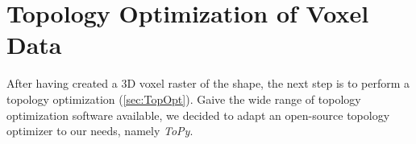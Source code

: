 \section{Topology Optimization of Voxel Data}
\label{sec:ToPy}
After having created a 3D voxel raster of the shape, the next step is to perform a topology optimization (\ref{sec:TopOpt}). 
Gaive the wide range of topology optimization software available, we decided to adapt an open-source topology optimizer to our needs, namely \emph{ToPy}.







